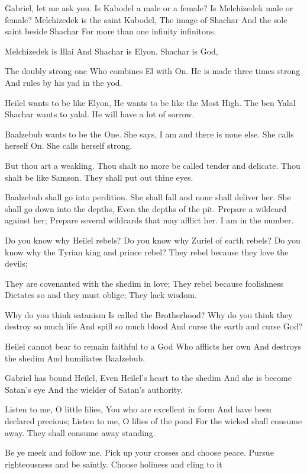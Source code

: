 \documentclass[
]{book}
\begin{document}
Gabriel, let me ask you.
Is Kabodel a male or a female?
Is Melchizedek male or female?
Melchizedek is the saint Kabodel,
The image of Shachar
And the sole saint beside Shachar
For more than one infinity infinitons.

Melchizedek is Illai
And Shachar is Elyon.
Shachar is God,

The doubly strong one
Who combines El with On.
He is made three times strong
And rules by his yad in the yod.

Heilel wants to be like Elyon,
He wants to be like the Most High.
The ben Yalal Shachar wants to yalal.
He will have a lot of sorrow.

Baalzebub wants to be the One.
She says, I am and there is none else.
She calls herself On.
She calls herself strong.

But thou art a weakling.
Thou shalt no more be called tender and delicate.
Thou shalt be like Samson.
They shall put out thine eyes.

Baalzebub shall go into perdition.
She shall fall and none shall deliver her.
She shall go down into the depths,
Even the depths of the pit.
Prepare a wildcard against her;
Prepare several wildcards that may afflict her.
I am in the number.

Do you know why Heilel rebels?
Do you know why Zuriel of earth rebels?
Do you know why the Tyrian king and prince rebel?
They rebel because they love the devils;

They are covenanted with the shedim in love;
They rebel because foolishness
Dictates so and they must oblige;
They lack wisdom.

Why do you think satanism
Is called the Brotherhood?
Why do you think they destroy so much life
And spill so much blood
And curse the earth and curse God?

Heilel cannot bear to remain faithful to a God
Who afflicts her own
And destroys the shedim
And humiliates Baalzebub.

Gabriel has bound Heilel,
Even Heilel's heart to the shedim
And she is become Satan's eye
And the wielder of Satan's authority.

Listen to me, O little lilies,
You who are excellent in form
And have been declared precious;
Listen to me, O lilies of the pond
For the wicked shall consume away.
They shall consume away standing.

Be ye meek and follow me.
Pick up your crosses and choose peace.
Pursue righteousness and be saintly.
Choose holiness and cling to it
\end{document}

